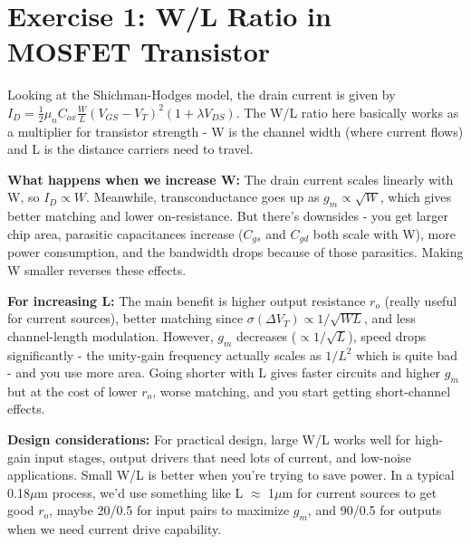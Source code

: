 \documentclass[main.tex]{subfiles}
\begin{document}
\section{Exercise 1: W/L Ratio in MOSFET Transistor}

Looking at the Shichman-Hodges model, the drain current is given by $I_D = \frac{1}{2} \mu_n C_{ox} \frac{W}{L} (V_{GS} - V_T)^2 (1 + \lambda V_{DS})$. The W/L ratio here basically works as a multiplier for transistor strength - W is the channel width (where current flows) and L is the distance carriers need to travel.

\textbf{What happens when we increase W:} The drain current scales linearly with W, so $I_D \propto W$. Meanwhile, transconductance goes up as $g_m \propto \sqrt{W}$, which gives better matching and lower on-resistance. But there's downsides - you get larger chip area, parasitic capacitances increase ($C_{gs}$ and $C_{gd}$ both scale with W), more power consumption, and the bandwidth drops because of those parasitics. Making W smaller reverses these effects.

\textbf{For increasing L:} The main benefit is higher output resistance $r_o$ (really useful for current sources), better matching since $\sigma(\Delta V_T) \propto 1/\sqrt{WL}$, and less channel-length modulation. However, $g_m$ decreases ($\propto 1/\sqrt{L}$), speed drops significantly - the unity-gain frequency actually scales as $1/L^2$ which is quite bad - and you use more area. Going shorter with L gives faster circuits and higher $g_m$ but at the cost of lower $r_o$, worse matching, and you start getting short-channel effects.

\textbf{Design considerations:} For practical design, large W/L works well for high-gain input stages, output drivers that need lots of current, and low-noise applications. Small W/L is better when you're trying to save power. In a typical 0.18$\mu$m process, we'd use something like L $\approx$ 1$\mu$m for current sources to get good $r_o$, maybe 20/0.5 for input pairs to maximize $g_m$, and 90/0.5 for outputs when we need current drive capability.
\end{document}
